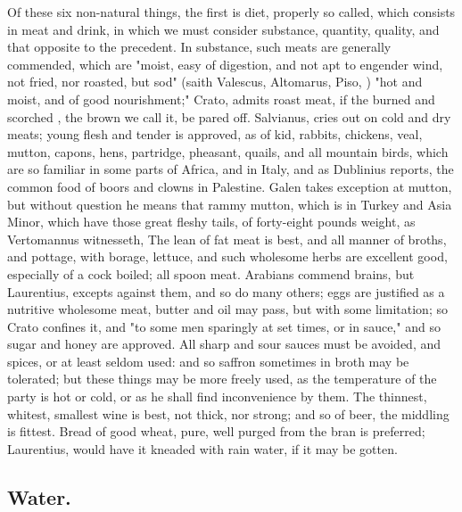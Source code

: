 {Of these six non-natural things, the first is diet, properly so called, which consists in meat and drink, in which we must consider substance, quantity, quality, and that opposite to the precedent. In substance, such meats are generally commended, which are "moist, easy of digestion, and not apt to engender wind, not fried, nor roasted, but sod" (saith Valescus, Altomarus, Piso, \etc{}) "hot and moist, and of good nourishment;" Crato,  admits roast meat, if the burned and scorched , the brown we call it, be pared off. Salvianus,  cries out on cold and dry meats; young flesh and tender is approved, as of kid, rabbits, chickens, veal, mutton, capons, hens, partridge, pheasant, quails, and all mountain birds, which are so familiar in some parts of Africa, and in Italy, and as Dublinius reports, the common food of boors and clowns in Palestine. Galen takes exception at mutton, but without question he means that rammy mutton, which is in Turkey and Asia Minor, which have those great fleshy tails, of forty-eight pounds weight, as Vertomannus witnesseth,  The lean of fat meat is best, and all manner of broths, and pottage, with borage, lettuce, and such wholesome herbs are excellent good, especially of a cock boiled; all spoon meat. Arabians commend brains, but Laurentius,  excepts against them, and so do many others; eggs are justified as a nutritive wholesome meat, butter and oil may pass, but with some limitation; so Crato confines it, and "to some men sparingly at set times, or in sauce," and so sugar and honey are approved. All sharp and sour sauces must be avoided, and spices, or at least seldom used: and so saffron sometimes in broth may be tolerated; but these things may be more freely used, as the temperature of the party is hot or cold, or as he shall find inconvenience by them. The thinnest, whitest, smallest wine is best, not thick, nor strong; and so of beer, the middling is fittest. Bread of good wheat, pure, well purged from the bran is preferred; Laurentius,  would have it kneaded with rain water, if it may be gotten.

\subsection{Water.}

}
